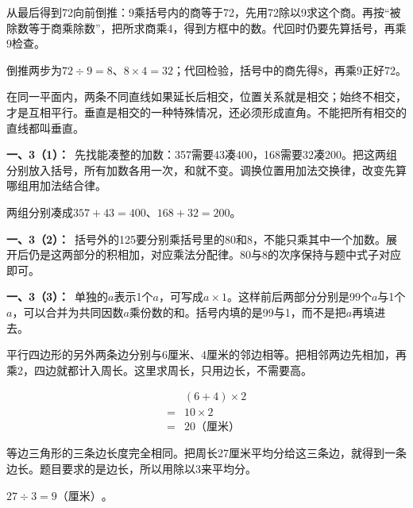 \documentclass[multi=snippet,border=0pt]{standalone}
\newenvironment{snippet}[3]{\begin{minipage}{#1bp}\color{answerred}\fontsize{#2}{#3}\selectfont\raggedright}{\end{minipage}}
\begin{document}
\begin{snippet}{505}{11.5}{14}从最后得到72向前倒推：9乘括号内的商等于72，先用72除以9求这个商。再按“被除数等于商乘除数”，把所求商乘4，得到方框中的数。代回时仍要先算括号，再乘9检查。\par 倒推两步为\(72\div9=8\)、\(8\times4=32\)；代回检验，括号中的商先得8，再乘9正好72。\end{snippet}
\begin{snippet}{505}{11.5}{14}在同一平面内，两条不同直线如果延长后相交，位置关系就是相交；始终不相交，才是互相平行。垂直是相交的一种特殊情况，还必须形成直角。不能把所有相交的直线都叫垂直。\end{snippet}
\begin{snippet}{505}{11.5}{14}\textbf{一、3（1）：}\ 先找能凑整的加数：357需要43凑400，168需要32凑200。把这两组分别放入括号，所有加数各用一次，和就不变。调换位置用加法交换律，改变先算哪组用加法结合律。\par 两组分别凑成\(357+43=400\)、\(168+32=200\)。\end{snippet}
\begin{snippet}{505}{11.5}{14}\textbf{一、3（2）：}\ 括号外的125要分别乘括号里的80和8，不能只乘其中一个加数。展开后仍是这两部分的积相加，对应乘法分配律。80与8的次序保持与题中式子对应即可。\end{snippet}
\begin{snippet}{505}{11.5}{14}\textbf{一、3（3）：}\ 单独的\(a\)表示1个\(a\)，可写成\(a\times1\)。这样前后两部分分别是99个\(a\)与1个\(a\)，可以合并为共同因数\(a\)乘份数的和。括号内填的是99与1，而不是把\(a\)再填进去。\end{snippet}
\begin{snippet}{505}{11.5}{14}平行四边形的另外两条边分别与6厘米、4厘米的邻边相等。把相邻两边先相加，再乘2，四边就都计入周长。这里求周长，只用边长，不需要高。\par \[\begin{aligned}&(6+4)\times2\\={}&10\times2\\={}&20\text{（厘米）}\end{aligned}\]\end{snippet}
\begin{snippet}{505}{11.5}{14}等边三角形的三条边长度完全相同。把周长27厘米平均分给这三条边，就得到一条边长。题目要求的是边长，所以用除以3来平均分。\par \(27\div3=9\text{（厘米）}\)。\end{snippet}
\end{document}
